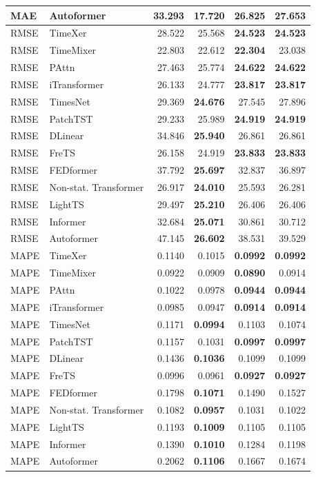 \begin{longtable}{llrrrr}
MAE & Autoformer & 33.293 & \textbf{17.720} & 26.825 & 27.653 \\
\midrule
RMSE & TimeXer & 28.522 & 25.568 & \textbf{24.523} & \textbf{24.523} \\
RMSE & TimeMixer & 22.803 & 22.612 & \textbf{22.304} & 23.038 \\
RMSE & PAttn & 27.463 & 25.774 & \textbf{24.622} & \textbf{24.622} \\
RMSE & iTransformer & 26.133 & 24.777 & \textbf{23.817} & \textbf{23.817} \\
RMSE & TimesNet & 29.369 & \textbf{24.676} & 27.545 & 27.896 \\
RMSE & PatchTST & 29.233 & 25.989 & \textbf{24.919} & \textbf{24.919} \\
RMSE & DLinear & 34.846 & \textbf{25.940} & 26.861 & 26.861 \\
RMSE & FreTS & 26.158 & 24.919 & \textbf{23.833} & \textbf{23.833} \\
RMSE & FEDformer & 37.792 & \textbf{25.697} & 32.837 & 36.897 \\
RMSE & Non-stat. Transformer & 26.917 & \textbf{24.010} & 25.593 & 26.281 \\
RMSE & LightTS & 29.497 & \textbf{25.210} & 26.406 & 26.406 \\
RMSE & Informer & 32.684 & \textbf{25.071} & 30.861 & 30.712 \\
RMSE & Autoformer & 47.145 & \textbf{26.602} & 38.531 & 39.529 \\
\midrule
MAPE & TimeXer & 0.1140 & 0.1015 & \textbf{0.0992} & \textbf{0.0992} \\
MAPE & TimeMixer & 0.0922 & 0.0909 & \textbf{0.0890} & 0.0914 \\
MAPE & PAttn & 0.1022 & 0.0978 & \textbf{0.0944} & \textbf{0.0944} \\
MAPE & iTransformer & 0.0985 & 0.0947 & \textbf{0.0914} & \textbf{0.0914} \\
MAPE & TimesNet & 0.1171 & \textbf{0.0994} & 0.1103 & 0.1074 \\
MAPE & PatchTST & 0.1157 & 0.1031 & \textbf{0.0997} & \textbf{0.0997} \\
MAPE & DLinear & 0.1436 & \textbf{0.1036} & 0.1099 & 0.1099 \\
MAPE & FreTS & 0.0996 & 0.0961 & \textbf{0.0927} & \textbf{0.0927} \\
MAPE & FEDformer & 0.1798 & \textbf{0.1071} & 0.1490 & 0.1527 \\
MAPE & Non-stat. Transformer & 0.1082 & \textbf{0.0957} & 0.1031 & 0.1022 \\
MAPE & LightTS & 0.1193 & \textbf{0.1009} & 0.1105 & 0.1105 \\
MAPE & Informer & 0.1390 & \textbf{0.1010} & 0.1284 & 0.1198 \\
MAPE & Autoformer & 0.2062 & \textbf{0.1106} & 0.1667 & 0.1674 \\
\end{longtable}
\endgroup

